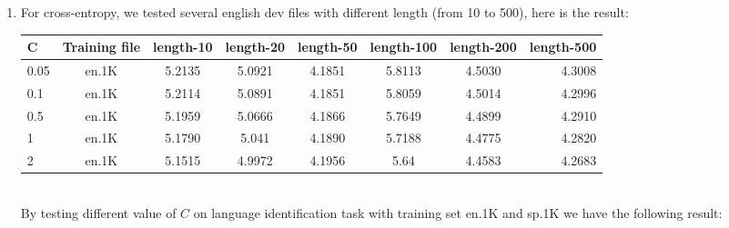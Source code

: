 \documentclass[10pt]{article}
\begin{document}
\begin{enumerate}
\begin{enumerate}
            \item
            For cross-entropy, we tested several english dev files with different length (from 10 to 500), here is the result:\\
            
               \begin{tabular}{| l | c | c | c | c | c | c | r |}
                \hline
                C & Training file & length-10 & length-20 & length-50 & length-100 & length-200 & length-500\\ \hline
                0.05 & en.1K & 5.2135 & 5.0921 & 4.1851 & 5.8113 & 4.5030 & 4.3008 \\ \hline
                0.1 & en.1K & 5.2114 & 5.0891 & 4.1851 & 5.8059 & 4.5014 & 4.2996 \\ \hline
                0.5 & en.1K & 5.1959 & 5.0666 & 4.1866 & 5.7649 & 4.4899 & 4.2910 \\ \hline
                1 & en.1K & 5.1790 & 5.041 & 4.1890 & 5.7188 & 4.4775 & 4.2820 \\ \hline
                2 & en.1K & 5.1515 & 4.9972 & 4.1956 & 5.64 & 4.4583 & 4.2683 \\ \hline
              \end{tabular}  \\
              
            By testing different value of $C$ on language identification task with training set en.1K and sp.1K we have the following result:\\
            

\end{enumerate}
\end{enumerate}
\end{document}
